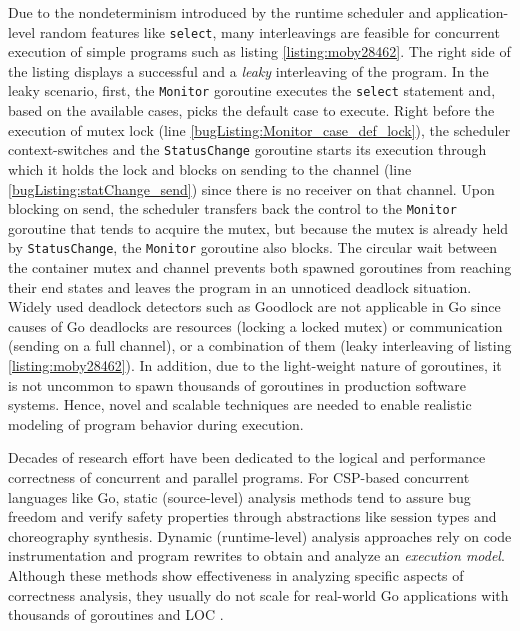 Due to the nondeterminism introduced by the runtime scheduler and application-level random features like \texttt{select}, many interleavings are feasible for concurrent execution of simple programs such as listing \ref{listing:moby28462}.
%
The right side of the listing displays a successful and a \textit{leaky} interleaving of the program.
%
In the leaky scenario, first, the \texttt{Monitor} goroutine executes the \texttt{select} statement and, based on the available cases, picks the default case to execute.
%
Right before the execution of mutex lock (line \ref{bugListing:Monitor_case_def_lock}), the scheduler context-switches and the \texttt{StatusChange} goroutine starts its execution through which it holds the lock and blocks on sending to the channel (line \ref{bugListing:statChange_send}) since there is no receiver on that channel.
%
Upon blocking on send, the scheduler transfers back the control to the \texttt{Monitor} goroutine that tends to acquire the mutex, but because the mutex is already held by \texttt{StatusChange}, the \texttt{Monitor} goroutine also blocks.
%
The circular wait between the container mutex and channel prevents both spawned goroutines from reaching their end states and leaves the program in an unnoticed deadlock situation.
%
Widely used deadlock detectors such as Goodlock \cite{havelund-goodlock-spin00} are not applicable in Go since causes of Go deadlocks are resources (\eg locking a locked mutex) or communication (\eg sending on a full channel), or a combination of them (\eg leaky interleaving of listing \ref{listing:moby28462}).
%
In addition, due to the light-weight nature of goroutines, it is not uncommon to spawn thousands of goroutines in production software systems.
%
Hence,  novel and scalable techniques are needed to enable realistic modeling of program behavior during execution.
%

Decades of research effort have been dedicated to the logical and performance correctness of concurrent and parallel programs.
%
For CSP-based concurrent languages like Go, static (source-level) analysis methods \cite{ng-dl-cc16,lange-fence-popl17,lange-staticType-icse18} tend to assure bug freedom and verify safety properties through abstractions like session types and choreography synthesis.
%
Dynamic (runtime-level) analysis approaches \cite{go-race-blog,sulzmann-twophase-2018,dilley-gomela-corr2020} rely on code instrumentation and program rewrites to obtain and analyze an \textit{execution model}.
%
Although these methods show effectiveness in analyzing specific aspects of correctness analysis, they usually do not scale for real-world Go applications with thousands of goroutines and LOC \cite{dilley-empirical-saner19}.

